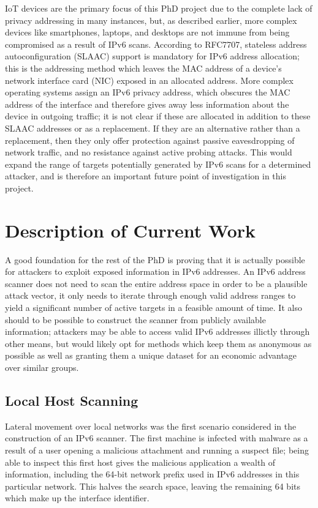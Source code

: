 \documentclass[10pt,sigconf]{acmart}
\begin{document}
IoT devices are the primary focus of this PhD project due to the complete lack of privacy addressing in many instances, but, as described earlier, more complex devices like smartphones, laptops, and desktops are not immune from being compromised as a result of IPv6 scans.
According to RFC7707, stateless address autoconfiguration (SLAAC) support is mandatory for IPv6 address allocation;
this is the addressing method which leaves the MAC address of a device's network interface card (NIC) exposed in an allocated address.
More complex operating systems assign an IPv6 privacy address, which obscures the MAC address of the interface and therefore gives away less information about the device in outgoing traffic;
it is not clear if these are allocated in addition to these SLAAC addresses or as a replacement.
If they are an alternative rather than a replacement, then they only offer protection against passive eavesdropping of network traffic, and no resistance against active probing attacks.
This would expand the range of targets potentially generated by IPv6 scans for a determined attacker, and is therefore an important future point of investigation in this project.




\section{Description of Current Work}


A good foundation for the rest of the PhD is proving that it is actually possible for attackers to exploit exposed information in IPv6 addresses.
An IPv6 address scanner does not need to scan the entire address space in order to be a plausible attack vector, it only needs to iterate through enough valid address ranges to yield a significant number of active targets in a feasible amount of time.
It also should to be possible to construct the scanner from publicly available information; 
attackers may be able to access valid IPv6 addresses illictly through other means, but would likely opt for methods which keep them as anonymous as possible as well as granting them a unique dataset for an economic advantage over similar groups.

\subsection{Local Host Scanning}
Lateral movement over local networks was the first scenario considered in the construction of an IPv6 scanner.
The first machine is infected with malware as a result of a user opening a malicious attachment and running a suspect file;
being able to inspect this first host gives the malicious application a wealth of information, including the 64-bit network prefix used in IPv6 addresses in this particular network.
This halves the search space, leaving the remaining 64 bits which make up the interface identifier.
\end{document}
